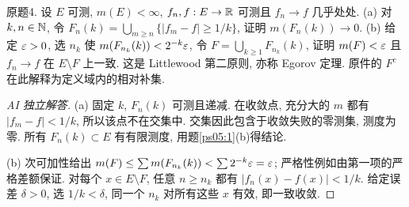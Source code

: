 \begin{exercise}\label{ps05:4}
原题4. 设 $E$ 可测, $m(E)<\infty$, $f_n,f:E\to\mathbb R$ 可测且 $f_n\to f$ 几乎处处. (a) 对 $k,n\in\mathbb N$, 令 $F_n(k)=\bigcup_{m\ge n}\{|f_m-f|\ge1/k\}$, 证明 $m(F_n(k))\to0$. (b) 给定 $\varepsilon>0$, 选 $n_k$ 使 $m(F_{n_k}(k))<2^{-k}\varepsilon$, 令 $F=\bigcup_{k\ge1}F_{n_k}(k)$, 证明 $m(F)<\varepsilon$ 且 $f_n\to f$ 在 $E\setminus F$ 上一致. 这是 Littlewood 第二原则, 亦称 Egorov 定理. 原件的 $F^c$ 在此解释为定义域内的相对补集.
\end{exercise}
\begin{proof}[AI 独立解答]
(a) 固定 $k$, $F_n(k)$ 可测且递减. 在收敛点, 充分大的 $m$ 都有 $|f_m-f|<1/k$, 所以该点不在交集中. 交集因此包含于收敛失败的零测集, 测度为零. 所有 $F_n(k)\subset E$ 有有限测度, 用题\ref{ps05:1}(b)得结论.

(b) 次可加性给出 $m(F)\le\sum m(F_{n_k}(k))<\sum2^{-k}\varepsilon=\varepsilon$; 严格性例如由第一项的严格差额保证. 对每个 $x\in E\setminus F$, 任意 $n\ge n_k$ 都有 $|f_n(x)-f(x)|<1/k$. 给定误差 $\delta>0$, 选 $1/k<\delta$, 同一个 $n_k$ 对所有这些 $x$ 有效, 即一致收敛.
\end{proof}

